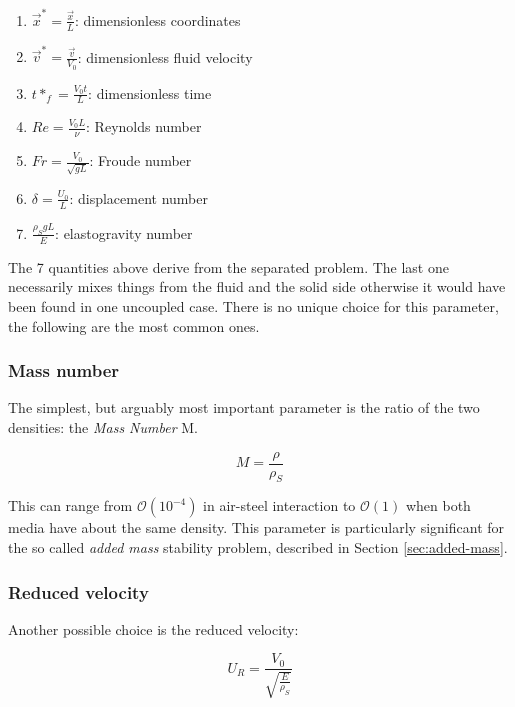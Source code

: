 \begin{enumerate}
	\item $\vec{x}^* = \frac{\vec{x}}{L}$: dimensionless coordinates
	\item $\vec{v}^* = \frac{\vec{v}}{V_0}$: dimensionless fluid velocity
	\item $t*_f = \frac{V_0 t}{L}$: dimensionless time
	\item $Re = \frac{V_0 L}{\nu}$: Reynolds number
	\item $Fr = \frac{V_0}{\sqrt{gL}}$: Froude number
	\item $\delta = \frac{U_0}{L}$: displacement number
	\item $\frac{\rho_S g L}{E}$: elastogravity number
\end{enumerate}

The 7 quantities above derive from the separated problem. The last one necessarily mixes things from the fluid and the solid side otherwise it would have been found in one uncoupled case. There is no unique choice for this parameter, the following are the most common ones.

\subsubsection{Mass number}
\label{subsec:mass-ratio}

The simplest, but arguably most important parameter is the ratio of the two densities: the \textit{Mass Number} M.

\begin{equation}
	M = \frac{\rho}{\rho_S}
	\label{eq:mass-number}
\end{equation}

This can range from $\mathcal{O}\left(10^{-4}\right)$ in air-steel interaction to $\mathcal{O}\left(1\right)$ when both media have about the same density. This parameter is particularly significant for the so called \textit{added mass} stability problem, described in Section \ref{sec:added-mass}.

\subsubsection{Reduced velocity}

Another possible choice is the reduced velocity:

\begin{equation}
	 U_R = \frac{V_0}{\sqrt{\frac{E}{\rho_S}}}
\end{equation}

